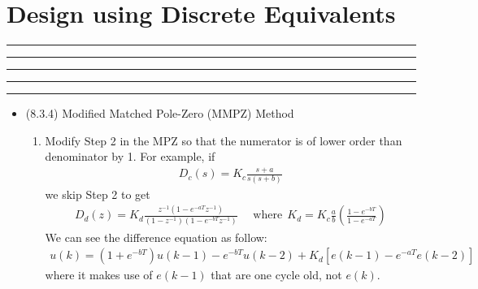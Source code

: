 \setcounter{chapter}{7}
\setcounter{section}{2}
\section{Design using Discrete Equivalents}
\vspace{-8pt} \hrule \hrule \hrule \hrule \hrule  \vspace{12pt}
\begin{itemize}
	\item (8.3.4) Modified Matched Pole-Zero (MMPZ) Method 
	\begin{enumerate}
		\item Modify Step 2 in the MPZ so that the numerator is of lower order than denominator by 1. For example, if
		\begin{align*}
			D_c(s) = K_c \frac{s+a}{s(s+b)}
		\end{align*}
		we skip Step 2 to get 
		\begin{align*}
			D_d(z) = K_d \frac{z^{-1}(1-e^{-aT}z^{-1})}{(1-z^{-1})(1-e^{-bT}z^{-1})} ~~~~~~\mbox{where}~~ K_d = K_c \frac{a}{b} \left( \frac{1-e^{-bT}}{1-e^{-aT}} \right) 
		\end{align*}
		We can see the difference equation as follow:
		\begin{align*}
			u(k) = (1+e^{-bT})u(k-1) - e^{-bT} u(k-2) + K_d [ e(k-1) - e^{-aT} e(k-2) ] 
		\end{align*}
		where it makes use of $e(k-1)$ that are one cycle old, not $e(k)$. 
	\end{enumerate}
\end{itemize}	